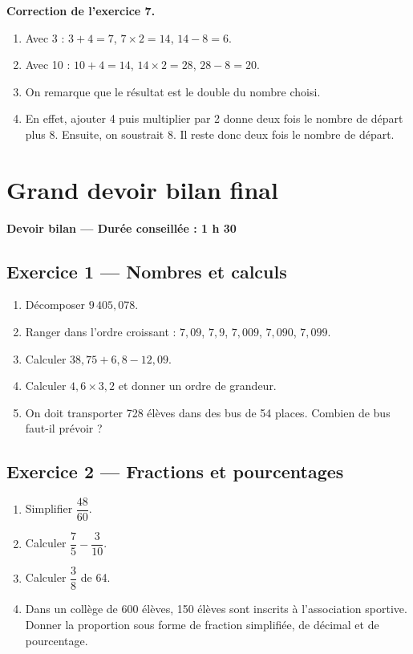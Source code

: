 \documentclass[11pt,a4paper]{article}
\newcounter{exo}
\begin{document}
\begin{corrbox}
\textbf{Correction de l'exercice 7.}
\begin{enumerate}[label=\alph*)]
\item Avec 3 : \(3+4=7\), \(7\times2=14\), \(14-8=6\).
\item Avec 10 : \(10+4=14\), \(14\times2=28\), \(28-8=20\).
\item On remarque que le résultat est le double du nombre choisi.
\item En effet, ajouter 4 puis multiplier par 2 donne deux fois le nombre de départ plus 8. Ensuite, on soustrait 8. Il reste donc deux fois le nombre de départ.
\end{enumerate}
\end{corrbox}

\newpage
\section{Grand devoir bilan final}

\begin{center}
\Large\bfseries Devoir bilan — Durée conseillée : 1 h 30
\end{center}

\subsection*{Exercice 1 — Nombres et calculs}
\begin{enumerate}[label=\arabic*)]
\item Décomposer \(9\,405,078\).
\item Ranger dans l'ordre croissant : \(7,09\), \(7,9\), \(7,009\), \(7,090\), \(7,099\).
\item Calculer \(38,75+6,8-12,09\).
\item Calculer \(4,6\times3,2\) et donner un ordre de grandeur.
\item On doit transporter 728 élèves dans des bus de 54 places. Combien de bus faut-il prévoir ?
\end{enumerate}

\subsection*{Exercice 2 — Fractions et pourcentages}
\begin{enumerate}[label=\arabic*)]
\item Simplifier \(\dfrac{48}{60}\).
\item Calculer \(\dfrac{7}{5}-\dfrac{3}{10}\).
\item Calculer \(\dfrac{3}{8}\) de 64.
\item Dans un collège de 600 élèves, 150 élèves sont inscrits à l'association sportive. Donner la proportion sous forme de fraction simplifiée, de décimal et de pourcentage.
\end{enumerate}
\end{document}
